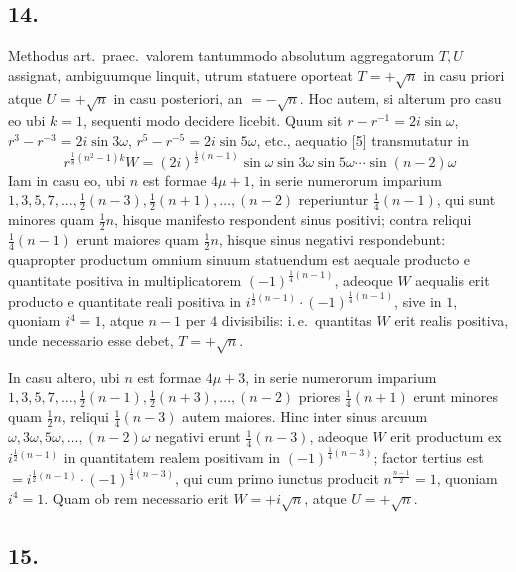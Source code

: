 \documentclass[12pt,a4paper]{article}
\theoremstyle{plain}
\begin{document}
\subsection*{14.}

Methodus art.\ praec.\ valorem tantummodo absolutum aggregatorum $T, U$ assignat, ambiguumque linquit, utrum statuere oporteat $T = +\sqrt{n}$ in casu priori atque $U = +\sqrt{n}$ in casu posteriori, an $= -\sqrt{n}$. Hoc autem, si alterum pro casu eo ubi $k = 1$, sequenti modo decidere licebit. Quum sit $r - r^{-1} = 2i\sin \omega$, $r^3 - r^{-3} = 2i\sin 3\omega$, $r^5 - r^{-5} = 2i\sin 5\omega$, etc., aequatio [5] transmutatur in
\[
r^{\frac{1}{8}(n^2-1)k} W = (2i)^{\frac{1}{2}(n-1)} \sin \omega \sin 3\omega \sin 5\omega \cdots \sin (n-2)\omega
\]
Iam in casu eo, ubi $n$ est formae $4\mu+1$, in serie numerorum imparium $1, 3, 5, 7, \ldots, \frac{1}{2}(n-3), \frac{1}{2}(n+1), \ldots, (n-2)$ reperiuntur $\frac{1}{4}(n-1)$, qui sunt minores quam $\frac{1}{2}n$, hisque manifesto respondent sinus positivi; contra reliqui $\frac{1}{4}(n-1)$ erunt maiores quam $\frac{1}{2}n$, hisque sinus negativi respondebunt: quapropter productum omnium sinuum statuendum est aequale producto e quantitate positiva in multiplicatorem $(-1)^{\frac{1}{4}(n-1)}$, adeoque $W$ aequalis erit producto e quantitate reali positiva in $i^{\frac{1}{2}(n-1)} \cdot (-1)^{\frac{1}{4}(n-1)}$, sive in $1$, quoniam $i^4 = 1$, atque $n-1$ per $4$ divisibilis: i.\,e.\ quantitas $W$ erit realis positiva, unde necessario esse debet, $T = +\sqrt{n}$.

In casu altero, ubi $n$ est formae $4\mu+3$, in serie numerorum imparium $1, 3, 5, 7, \ldots, \frac{1}{2}(n-1), \frac{1}{2}(n+3), \ldots, (n-2)$ priores $\frac{1}{4}(n+1)$ erunt minores quam $\frac{1}{2}n$, reliqui $\frac{1}{4}(n-3)$ autem maiores. Hinc inter sinus arcuum $\omega, 3\omega, 5\omega, \ldots, (n-2)\omega$ negativi erunt $\frac{1}{4}(n-3)$, adeoque $W$ erit productum ex $i^{\frac{1}{2}(n-1)}$ in quantitatem realem positivam in $(-1)^{\frac{1}{4}(n-3)}$; factor tertius est $= i^{\frac{1}{2}(n-1)} \cdot (-1)^{\frac{1}{4}(n-3)}$, qui cum primo iunctus producit $n^{\frac{n-1}{2}} = 1$, quoniam $i^4 = 1$. Quam ob rem necessario erit $W = +i\sqrt{n}$, atque $U = +\sqrt{n}$.

\subsection*{15.}
\end{document}
